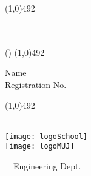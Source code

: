 \thispagestyle{empty} %
\parindent0pt
\onehalfspacing
\linethickness{2mm}
\line(1,0){492}
\vfill
	\parbox[t]{1.0\linewidth}{
		\centering \fontsize{40pt}{40pt}\selectfont %
		\vspace*{0.2cm} %
		\hfill \thetitle\\
		\hfill \thesemester \\
		\hfill (\thecoursecode)
\linethickness{0.5mm}
\line(1,0){492}\\
{\large\selectfont
\begin{flushleft} 
Name\\
Registration No.\\
\end{flushleft}
}
}
\vspace{0.2cm}
\linethickness{2mm}
\line(1,0){492}\\
\colorbox{\thecolor}{
	\parbox[t]{1.0\linewidth}{
		\centering \fontsize{50pt}{60pt}\selectfont %
		\vspace*{1.2cm} %
		\hfill \thedepartment \\

		\hfill \texttt{[image: logoSchool]}\\
		\vspace{30pt}
		\hfill
		\texttt{[image: logoMUJ]}

		\vspace*{1.5cm} %
	}
}
\vfill
{\centering \large 
		\hfill \textcopyright\ \thedepartment\  Engineering Dept.\\
		\hfill \theuniversity\\
		\hfill \theyear \\
		\HRule{1pt}} %
\clearpage %
\singlespacing